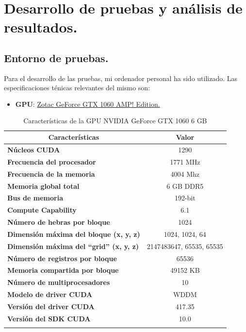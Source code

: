 \chapter{Desarrollo de pruebas y análisis de resultados.}
\section{Entorno de pruebas.}
Para el desarrollo de las pruebas, mi ordenador personal ha sido utilizado. Las especificaciones ténicas relevantes del mismo son:

\begin{itemize}
\item \textbf{GPU}: \underline{Zotac GeForce GTX 1060 AMP! Edition.}
\end{itemize}

\begin{longtable}{@{}lc@{}}
\toprule
\multicolumn{1}{c}{\textbf{Características}}     & \textbf{Valor}           \\* \midrule
\endfirsthead
%
\endhead
%
\bottomrule
\endfoot
%
\endlastfoot
%
\textbf{Núcleos CUDA}                            & 1290                     \\
\textbf{Frecuencia del procesador}               & 1771 MHz                 \\
\textbf{Frecuencia de la memoria}                & 4004 Mhz                 \\
\textbf{Memoria global total}                    & 6 GB DDR5                \\
\textbf{Bus de memoria}                          & 192-bit                  \\
\textbf{Compute Capability}                      & 6.1                      \\
\textbf{Número de hebras por bloque}             & 1024                     \\
\textbf{Dimensión máxima del bloque (x, y, z)}   & 1024, 1024, 64           \\
\textbf{Dimensión máxima del ``grid'' (x, y, z)} & 2147483647, 65535, 65535 \\
\textbf{Número de registros por bloque}          & 65536                    \\
\textbf{Memoria compartida por bloque}           & 49152 KB                 \\
\textbf{Número de multiprocesadores}             & 10                       \\
\textbf{Modelo de driver CUDA}                   & WDDM                     \\
\textbf{Versión del driver CUDA}                 & 417.35                   \\
\textbf{Versión del SDK CUDA}                    & 10.0                     \\* \bottomrule
\caption{Características de la GPU NVIDIA GeForce GTX 1060 6 GB}
\label{tab:esptec}\\
\end{longtable}

